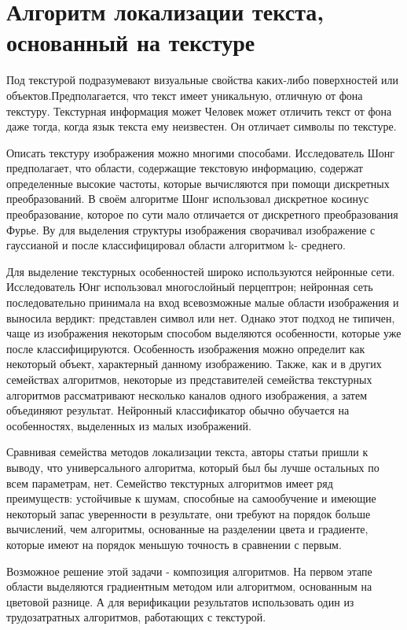 \documentclass[oneside,final,14pt]{extreport}
\begin{document}
\section{Алгоритм локализации текста, основанный на текстуре}
Под текстурой подразумевают визуальные свойства каких-либо поверхностей или объектов.Предполагается, что текст имеет уникальную, отличную от фона текстуру. Текстурная информация может  Человек может отличить текст от фона даже тогда, когда язык текста ему неизвестен. Он отличает символы по текстуре. 

Описать текстуру изображения можно многими способами. Исследователь Шонг   предполагает, что области, содержащие текстовую информацию, содержат определенные высокие частоты, которые вычисляются при помощи дискретных преобразований. В своём алгоритме Шонг использовал дискретное косинус преобразование, которое по сути мало отличается от дискретного преобразования Фурье.  Ву для выделения структуры изображения сворачивал изображение с гауссианой и после классифицировал области алгоритмом k- среднего.

Для выделение текстурных особенностей широко используются нейронные сети. Исследователь Юнг  использовал многослойный перцептрон; нейронная сеть последовательно принимала на вход всевозможные малые области изображения и выносила вердикт: представлен символ или нет. Однако этот подход не типичен, чаще из изображения некоторым способом выделяются особенности, которые уже после классифицируются. Особенность изображения можно определит как некоторый объект, характерный данному изображению. Также, как и в других семействах алгоритмов, некоторые из представителей семейства текстурных алгоритмов рассматривают несколько каналов одного изображения, а затем объединяют результат. Нейронный классификатор обычно обучается на особенностях, выделенных из малых изображений.  

Сравнивая семейства методов локализации текста, авторы статьи \cite{JDAR_survey} пришли к выводу, что универсального алгоритма, который был бы лучше остальных по всем параметрам, нет.  Семейство текстурных алгоритмов имеет ряд преимуществ: устойчивые к шумам, способные на самообучение и имеющие некоторый запас уверенности в результате, они требуют на порядок больше вычислений, чем алгоритмы, основанные на разделении цвета и градиенте, которые имеют на порядок меньшую точность в сравнении с первым. 

Возможное решение этой задачи - композиция алгоритмов. На первом этапе области выделяются градиентным методом или алгоритмом, основанным на цветовой разнице. А для верификации результатов использовать один из трудозатратных алгоритмов, работающих с текстурой.   
\end{document}
